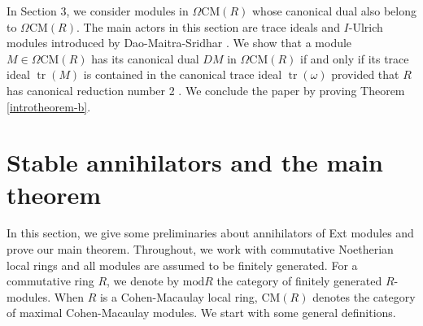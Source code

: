 \documentclass[12pt]{amsart}
\newcommand{\module}{\mathrm{mod}}
\newcommand{\CM}{\mathrm{CM}}
\theoremstyle{definition}
\numberwithin{equation}{theorem}
\DeclareMathOperator{\tr}{\mathrm{tr}}
\begin{document}
In Section 3, we consider modules in $\Omega \CM(R)$ whose canonical dual also belong to $\Omega \CM(R)$. The main actors in this section are trace ideals and $I$-Ulrich modules introduced by Dao-Maitra-Sridhar \cite{Dao-Maitra-Sridhar}. We show that a module $M \in \Omega \CM(R)$ has its canonical dual $DM$ in $\Omega \CM(R)$ if and only if its trace ideal $\tr(M)$ is contained in the canonical trace ideal $\tr(\omega)$ provided that $R$ has canonical reduction number 2 \cite{Kumashiro}. We conclude the paper by proving Theorem \ref{introtheorem-b}.

\section{Stable annihilators and the main theorem}

In this section, we give some preliminaries about annihilators of Ext modules and prove our main theorem. Throughout, we work with commutative Noetherian local rings and all modules are assumed to be finitely generated. For a commutative ring $R$, we denote by $\module R$ the category of finitely generated $R$-modules. When $R$ is a Cohen-Macaulay local ring, $\CM(R)$ denotes the category of maximal Cohen-Macaulay modules. We start with some general definitions.
\end{document}
